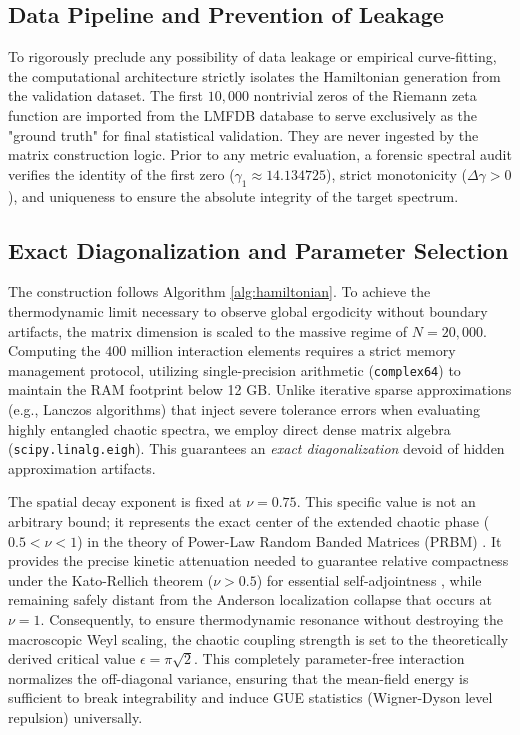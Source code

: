 \documentclass[prl,aps,floatfix,superscriptaddress,10pt]{revtex4-2}
\begin{document}
\subsection{Data Pipeline and Prevention of Leakage}
To rigorously preclude any possibility of data leakage or empirical curve-fitting, the computational architecture strictly isolates the Hamiltonian generation from the validation dataset. The first $10,000$ nontrivial zeros of the Riemann zeta function are imported from the LMFDB database \cite{LMFDB} to serve exclusively as the "ground truth" for final statistical validation. They are never ingested by the matrix construction logic. Prior to any metric evaluation, a forensic spectral audit verifies the identity of the first zero ($\gamma_1 \approx 14.134725$), strict monotonicity ($\Delta \gamma > 0$), and uniqueness to ensure the absolute integrity of the target spectrum.

\subsection{Exact Diagonalization and Parameter Selection}
The construction follows Algorithm \ref{alg:hamiltonian}. To achieve the thermodynamic limit necessary to observe global ergodicity without boundary artifacts, the matrix dimension is scaled to the massive regime of $N=20,000$. Computing the $400$ million interaction elements requires a strict memory management protocol, utilizing single-precision arithmetic (\texttt{complex64}) to maintain the RAM footprint below 12 GB.
Unlike iterative sparse approximations (e.g., Lanczos algorithms) that inject severe tolerance errors when evaluating highly entangled chaotic spectra, we employ direct dense matrix algebra (\texttt{scipy.linalg.eigh}). This guarantees an \textit{exact diagonalization} devoid of hidden approximation artifacts.

The spatial decay exponent is fixed at $\nu = 0.75$. This specific value is not an arbitrary bound; it represents the exact center of the extended chaotic phase ($0.5 < \nu < 1$) in the theory of Power-Law Random Banded Matrices (PRBM) \cite{Mirlin1996}. It provides the precise kinetic attenuation needed to guarantee relative compactness under the Kato-Rellich theorem ($\nu > 0.5$) for essential self-adjointness \cite{ReedSimon1975}, while remaining safely distant from the Anderson localization collapse that occurs at $\nu = 1$. Consequently, to ensure thermodynamic resonance without destroying the macroscopic Weyl scaling, the chaotic coupling strength is set to the theoretically derived critical value $\epsilon = \pi \sqrt{2}$. This completely parameter-free interaction normalizes the off-diagonal variance, ensuring that the mean-field energy is sufficient to break integrability and induce GUE statistics (Wigner-Dyson level repulsion) universally.
\end{document}
